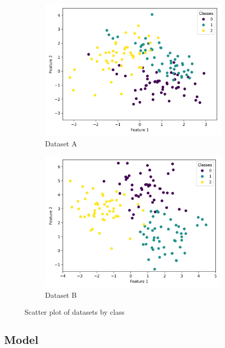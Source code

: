\documentclass{article}
\begin{document}
\begin{figure}
  \centering
  \begin{subfigure}[t]{0.49\textwidth}
    \centering
    \includegraphics[width=\linewidth]{scatter_A.png}
    \caption{Dataset A}
  \end{subfigure}
  \hfill
  \begin{subfigure}[t]{0.49\textwidth}
    \centering
    \includegraphics[width=\linewidth]{scatter_B.png}
    \caption{Dataset B}
  \end{subfigure}
  \caption{Scatter plot of datasets by class}
  \label{fig:data}
\end{figure}

\subsection{Model}
\end{document}
